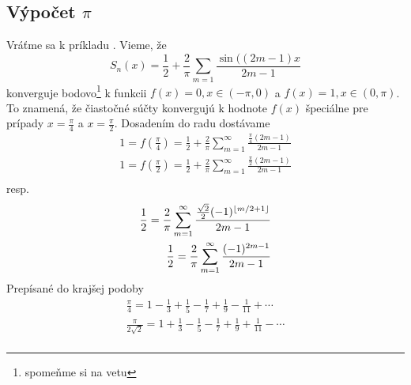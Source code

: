 \subsection{Výpočet $\pi$}

Vráťme sa k príkladu .
Vieme, že
\begin{equation}
    S_n(x) = \frac{1}{2} + \frac{2}{\pi} 
        \sum_{m=1} \frac{\sin((2m-1)x}{2m-1}
\end{equation}
konverguje bodovo\footnote{spomeňme si na vetu } 
k funkcii $f(x)=0, x\in (-\pi,0)$ a $f(x)=1, x\in (0,\pi)$.
To znamená, že čiastočné súčty konvergujú k hodnote $f(x)$ špeciálne
pre prípady $x=\frac{\pi}{4}$ a $x=\frac{\pi}{2}$. Dosadením do radu
dostávame
\begin{align}
   1= f(\frac{\pi}{4}) = \frac{1}{2} + \frac{2}{\pi}
    \sum_{m=1}^{\infty} \frac{\frac{\pi}{4} (2m-1)}{2m-1} \\
   1= f(\frac{\pi}{2}) = \frac{1}{2} + \frac{2}{\pi}
    \sum_{m=1}^{\infty} \frac{\frac{\pi}{2} (2m-1)}{2m-1} \\
\end{align}
resp.
\begin{align}
   \frac{1}{2}= \frac{2}{\pi}
    \sum_{m=1}^{\infty} \frac{\frac{\sqrt{2}}{2} (-1)^{\lfloor m/2+1 \rfloor}}{2m-1} \\
   \frac{1}{2} = \frac{2}{\pi}
    \sum_{m=1}^{\infty} \frac{(-1)^{2m-1}}{2m-1} \\
\end{align}
Prepísané do krajšej podoby
\begin{align}
    \frac{\pi}{4} = 1 - \frac{1}{3} + \frac{1}{5} - \frac{1}{7} +
    \frac{1}{9} - \frac{1}{11} + \cdots \\ 
    \frac{\pi}{2 \sqrt{2}} = 1 + \frac{1}{3} - \frac{1}{5} - \frac{1}{7} +
    \frac{1}{9} + \frac{1}{11} - \cdots \\
\end{align}
